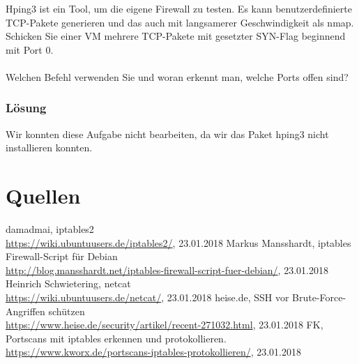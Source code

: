 Hping3 ist ein Tool, um die eigene Firewall zu testen. Es kann benutzerdefinierte TCP-Pakete generieren und das auch mit langsamerer Geschwindigkeit als nmap. Schicken Sie einer VM mehrere TCP-Pakete mit gesetzter SYN-Flag beginnend mit Port 0. \\
\\
Welchen Befehl verwenden Sie und woran erkennt man, welche Ports offen sind?

\subsubsection{Lösung}

Wir konnten diese Aufgabe nicht bearbeiten, da wir das Paket hping3 nicht installieren konnten.



\section{Quellen}
\begin{thebibliography}{999}
 damadmai, iptables2 \\ \url{https://wiki.ubuntuusers.de/iptables2/}, 23.01.2018 
 Markus Mansshardt, iptables Firewall-Script für Debian \\ \url{http://blog.mansshardt.net/iptables-firewall-script-fuer-debian/}, 23.01.2018
 Heinrich Schwietering, netcat \\ \url{https://wiki.ubuntuusers.de/netcat/}, 23.01.2018
 heise.de, SSH vor Brute-Force-Angriffen schützen \\ \url{https://www.heise.de/security/artikel/recent-271032.html}, 23.01.2018
 FK, Portscans mit iptables erkennen und protokollieren. \\ \url{https://www.kworx.de/portscans-iptables-protokollieren/}, 23.01.2018

\end{thebibliography}




